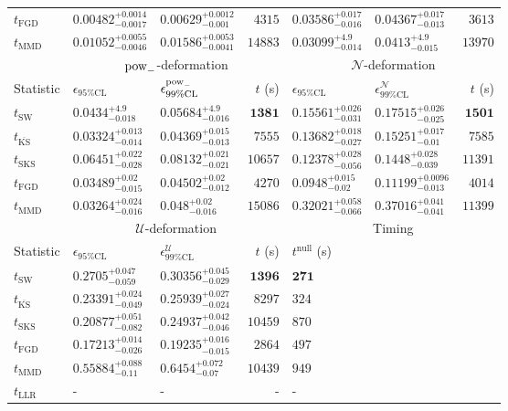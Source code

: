 \begin{tabular}{l|llr|llr}
	$t_{\mathrm{FGD}}$ & ${\mathbf{0.00482_{-0.0017}^{+0.0014}}}$ & ${\mathbf{0.00629_{-0.001}^{+0.0012}}}$ & $4315$ & $0.03586_{-0.016}^{+0.017}$ & $0.04367_{-0.013}^{+0.017}$ & $3613$ \\
	$t_{\mathrm{MMD}}$ & $0.01052_{-0.0046}^{+0.0055}$ & $0.01586_{-0.0041}^{+0.0053}$ & $14883$ & ${\mathbf{0.03099_{-0.014}^{+4.9}}}$ & ${\mathbf{0.0413_{-0.015}^{+4.9}}}$ & $13970$ \\
	\toprule
	\multicolumn{1}{c}{} & \multicolumn{3}{c}{$\rm{pow}_{-}$-deformation} & \multicolumn{3}{c}{$\mathcal{N}$-deformation} \\
	Statistic & $\epsilon_{95\%\mathrm{CL}}$ & $\epsilon^  {\rm{pow}_{-}}_{99\%\mathrm{CL}}$ & $t$ (s) & $\epsilon_{95\%\mathrm{CL}}$ & $\epsilon^    {\mathcal{N}}_{99\%\mathrm{CL}}$ & $t$ (s) \\
	\midrule
	$t_{\mathrm{SW}}$ & $0.0434_{-0.018}^{+4.9}$ & $0.05684_{-0.016}^{+4.9}$ & ${\mathbf{1381}}$ & $0.15561_{-0.031}^{+0.026}$ & $0.17515_{-0.025}^{+0.026}$ & ${\mathbf{1501}}$ \\
	$t_{\overline{\mathrm{KS}}}$ & $0.03324_{-0.014}^{+0.013}$ & ${\mathbf{0.04369_{-0.013}^{+0.015}}}$ & $7555$ & $0.13682_{-0.027}^{+0.018}$ & $0.15251_{-0.01}^{+0.017}$ & $7585$ \\
	$t_{\mathrm{SKS}}$ & $0.06451_{-0.028}^{+0.022}$ & $0.08132_{-0.021}^{+0.021}$ & $10657$ & $0.12378_{-0.056}^{+0.028}$ & $0.1448_{-0.039}^{+0.028}$ & $11391$ \\
	$t_{\mathrm{FGD}}$ & $0.03489_{-0.015}^{+0.02}$ & $0.04502_{-0.012}^{+0.02}$ & $4270$ & ${\mathbf{0.0948_{-0.02}^{+0.015}}}$ & ${\mathbf{0.11199_{-0.013}^{+0.0096}}}$ & $4014$ \\
	$t_{\mathrm{MMD}}$ & ${\mathbf{0.03264_{-0.016}^{+0.024}}}$ & $0.048_{-0.016}^{+0.02}$ & $15086$ & $0.32021_{-0.066}^{+0.058}$ & $0.37016_{-0.041}^{+0.041}$ & $11399$ \\
	\toprule
	\multicolumn{1}{c}{} & \multicolumn{3}{c}{$\mathcal{U}$-deformation} & \multicolumn{3}{c}{Timing} \\
	Statistic & $\epsilon_{95\%\mathrm{CL}}$ & $\epsilon^    {\mathcal{U}}_{99\%\mathrm{CL}}$ & $t$ (s) & $t^{\mathrm{null}}$ (s) \\
	\midrule
	$t_{\mathrm{SW}}$ & $0.2705_{-0.059}^{+0.047}$ & $0.30356_{-0.029}^{+0.045}$ & ${\mathbf{1396}}$ & ${\mathbf{271}}$ \\
	$t_{\overline{\mathrm{KS}}}$ & $0.23391_{-0.049}^{+0.024}$ & $0.25939_{-0.024}^{+0.027}$ & $8297$ & $324$ \\
	$t_{\mathrm{SKS}}$ & $0.20877_{-0.082}^{+0.051}$ & $0.24937_{-0.046}^{+0.042}$ & $10459$ & $870$ \\
	$t_{\mathrm{FGD}}$ & ${\mathbf{0.17213_{-0.026}^{+0.014}}}$ & ${\mathbf{0.19235_{-0.015}^{+0.016}}}$ & $2864$ & $497$ \\
	$t_{\mathrm{MMD}}$ & $0.55884_{-0.11}^{+0.088}$ & $0.6454_{-0.07}^{+0.072}$ & $10439$ & $949$ \\
	$t_{\mathrm{LLR}}$ & - & - & - & - \\
	\bottomrule
\end{tabular}
